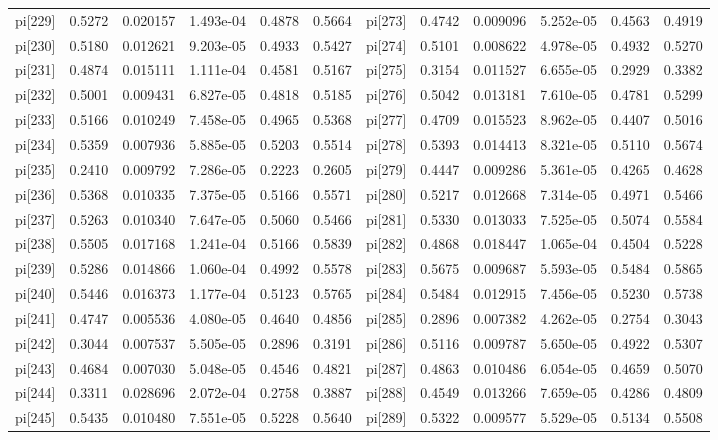 \documentclass[12pt]{article}
\begin{document}
\begin{table}[h!]
\begin{tabular}{|llllll|llllll}
pi[229] & 0.5272 & 0.020157  & 1.493e-04 &0.4878 &0.5664 & pi[273] & 0.4742 & 0.009096 & 5.252e-05 & 0.4563 &0.4919 \\
pi[230] & 0.5180 & 0.012621  & 9.203e-05 &0.4933 &0.5427 & pi[274] & 0.5101 & 0.008622 & 4.978e-05 & 0.4932 &0.5270 \\ 
pi[231] & 0.4874 & 0.015111  & 1.111e-04 &0.4581 &0.5167 & pi[275] & 0.3154 & 0.011527 & 6.655e-05 & 0.2929 &0.3382 \\ 
pi[232] & 0.5001 & 0.009431  & 6.827e-05 &0.4818 &0.5185 & pi[276] & 0.5042 & 0.013181 & 7.610e-05 & 0.4781 &0.5299 \\ 
pi[233] & 0.5166 & 0.010249  & 7.458e-05 &0.4965 &0.5368 & pi[277] & 0.4709 & 0.015523 & 8.962e-05 & 0.4407 &0.5016 \\ 
pi[234] & 0.5359 & 0.007936  & 5.885e-05 &0.5203 &0.5514 & pi[278] & 0.5393 & 0.014413 & 8.321e-05 & 0.5110 &0.5674 \\ 
pi[235] & 0.2410 & 0.009792  & 7.286e-05 &0.2223 &0.2605 & pi[279] & 0.4447 & 0.009286 & 5.361e-05 & 0.4265 &0.4628 \\ 
pi[236] & 0.5368 & 0.010335  & 7.375e-05 &0.5166 &0.5571 & pi[280] & 0.5217 & 0.012668 & 7.314e-05 & 0.4971 &0.5466 \\ 
pi[237] & 0.5263 & 0.010340  & 7.647e-05 &0.5060 &0.5466 & pi[281] & 0.5330 & 0.013033 & 7.525e-05 & 0.5074 &0.5584 \\ 
pi[238] & 0.5505 & 0.017168  & 1.241e-04 & 0.5166 &0.5839 & pi[282] & 0.4868 & 0.018447 & 1.065e-04 & 0.4504 &0.5228 \\ 
pi[239] & 0.5286 & 0.014866  & 1.060e-04 &0.4992 &0.5578 & pi[283] & 0.5675 & 0.009687 & 5.593e-05 & 0.5484 &0.5865 \\ 
pi[240] & 0.5446 & 0.016373  & 1.177e-04 &0.5123 &0.5765 & pi[284] & 0.5484 & 0.012915 & 7.456e-05 & 0.5230 &0.5738 \\ 
pi[241] & 0.4747 & 0.005536  & 4.080e-05 &0.4640 &0.4856 & pi[285] & 0.2896 & 0.007382 & 4.262e-05 & 0.2754 &0.3043 \\ 
pi[242] & 0.3044 & 0.007537  & 5.505e-05 &0.2896 &0.3191 & pi[286] & 0.5116 & 0.009787 & 5.650e-05 & 0.4922 &0.5307 \\ 
pi[243] & 0.4684 & 0.007030  & 5.048e-05 &0.4546 &0.4821 & pi[287] & 0.4863 & 0.010486 & 6.054e-05 & 0.4659 &0.5070 \\ 
pi[244] & 0.3311 & 0.028696  & 2.072e-04 &0.2758 &0.3887 & pi[288] & 0.4549 & 0.013266 & 7.659e-05 & 0.4286 &0.4809 \\ 
pi[245] & 0.5435 & 0.010480  & 7.551e-05 &0.5228 &0.5640 & pi[289] & 0.5322 & 0.009577 & 5.529e-05 & 0.5134 &0.5508 \\

\end{tabular}
\end{table}
\end{document}
